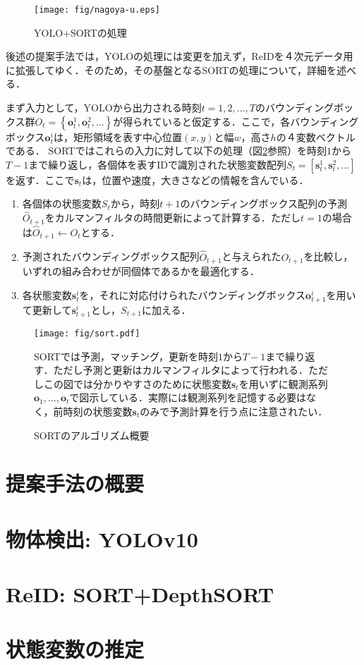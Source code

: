 \begin{figure}[h]
    \centering    
    \texttt{[image: fig/nagoya-u.eps]}
    \caption{YOLO+SORTの処理}
    \label{fig:yolosort}
\end{figure}

後述の提案手法では，YOLOの処理には変更を加えず，ReIDを４次元データ用に拡張してゆく．そのため，その基盤となるSORTの処理について，詳細を述べる．
\par
まず入力として，YOLOから出力される時刻$t=1,2,...,T$のバウンディングボックス群$O_t = \left\{\bm{o}_t^1, \bm{o}_t^2,...\right\}$が得られていると仮定する．ここで，各バウンディングボックス$\bm{o}_t^i$は，矩形領域を表す中心位置$(x,y)$と幅$w$，高さ$h$の４変数ベクトルである． SORTではこれらの入力に対して以下の処理（図\ref{fig:sort}参照）を時刻$1$から$T-1$まで繰り返し，各個体を表すIDで識別された状態変数配列$S_t = \left[\bm{s}_t^1, \bm{s}_t^2,...\right]$を返す．ここで$\bm{s}_t$は，位置や速度，大きさなどの情報を含んでいる．

\begin{enumerate}
    \item 各個体の状態変数$S_t$から，時刻$t+1$のバウンディングボックス配列の予測$\hat{O}_{t+1}$をカルマンフィルタ\cite{adachi2012kalman}の時間更新によって計算する．ただし$t=1$の場合は$\hat{O}_{t+1} \leftarrow O_t$とする．
    \item 予測されたバウンディングボックス配列$\hat{O}_{t+1}$と与えられた$O_{t+1}$を比較し，いずれの組み合わせが同個体であるかを最適化する．
    \item 各状態変数$\bm{s}_t^i$を，それに対応付けられたバウンディングボックス$\bm{o}_{t+1}^i$を用いて更新して$\bm{s}_{t+1}^i$とし，$S_{t+1}$に加える．
\end{enumerate}

\begin{figure}[h]
    \centering    
    \texttt{[image: fig/sort.pdf]}
    \caption{SORTのアルゴリズム概要}
    \small
    SORTでは予測，マッチング，更新を時刻$1$から$T-1$まで繰り返す．ただし予測と更新はカルマンフィルタによって行われる．ただしこの図では分かりやすさのために状態変数$\bm{s}_t$を用いずに観測系列$\bm{o}_1,...,\bm{o}_t$で図示している．実際には観測系列を記憶する必要はなく，前時刻の状態変数$\bm{s}_t$のみで予測計算を行う点に注意されたい．
    \label{fig:sort}
\end{figure}


\section{提案手法の概要}

\section{物体検出: YOLOv10}

\section{ReID: SORT+DepthSORT}

\section{状態変数の推定}